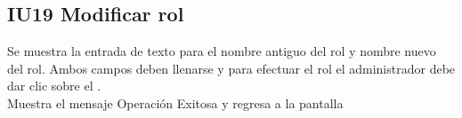 \newpage
\subsection{IU19 Modificar rol}
	Se muestra la entrada de texto para el nombre antiguo del rol y nombre nuevo del rol. Ambos campos deben llenarse y para efectuar el rol el administrador debe dar clic sobre el . \\
	Muestra el mensaje Operación Exitosa y regresa a la pantalla 
